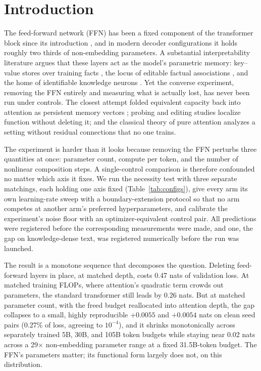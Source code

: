 \documentclass[letterpaper]{article} %
\begin{document}
\section{Introduction}

The feed-forward network (FFN) has been a fixed component of the
transformer block since its introduction \citep{vaswani2017attention}, and
in modern decoder configurations it holds roughly two thirds of
non-embedding parameters. A substantial interpretability literature argues
that these layers act as the model's parametric memory: key--value stores
over training facts \citep{geva2021transformer,geva2022transformer}, the
locus of editable factual associations \citep{meng2022locating}, and the
home of identifiable knowledge neurons \citep{dai2022knowledge}. Yet the
converse experiment, removing the FFN entirely and measuring what is
actually lost, has never been run under controls. The closest attempt
folded equivalent capacity back into attention as persistent memory
vectors \citep{sukhbaatar2019augmenting}; probing and editing studies
localize function without deleting it; and the classical theory of pure
attention \citep{dong2021attention} analyzes a setting without residual
connections that no one trains.

The experiment is harder than it looks because removing the FFN perturbs
three quantities at once: parameter count, compute per token, and the
number of nonlinear composition steps. A single-control comparison is
therefore confounded no matter which axis it fixes. We run the necessity
test with three separate matchings, each holding one axis fixed
(Table~\ref{tab:configs}), give every arm its own learning-rate sweep with
a boundary-extension protocol so that no arm competes at another arm's
preferred hyperparameters, and calibrate the experiment's noise floor with
an optimizer-equivalent control pair. All predictions were registered
before the corresponding measurements were made, and one, the gap on
knowledge-dense text, was registered numerically before the run was
launched.

The result is a monotone sequence that decomposes the question. Deleting
feed-forward layers in place, at matched depth, costs 0.47 nats of
validation loss. At matched training FLOPs, where attention's quadratic
term crowds out parameters, the standard transformer still leads by 0.26
nats. But at matched parameter count, with the freed budget reallocated
into attention depth, the gap collapses to a small, highly reproducible
$+0.0055$ and $+0.0054$ nats on clean seed pairs (0.27\% of loss, agreeing
to $10^{-4}$), and it shrinks monotonically across separately trained 5B,
30B, and 105B token budgets while staying near 0.02 nats across a
29$\times$ non-embedding parameter range at a fixed 31.5B-token budget.
The FFN's parameters matter; its functional form largely does not, on
this distribution.
\end{document}
